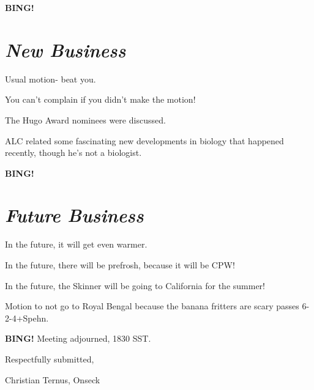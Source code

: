 \documentclass[10pt]{article}
\newcommand{\bing}{{\bf BING!} }
\newcommand{\goto}[1]{\bing \vskip 12pt \section*{{\em{#1}}}}
\begin{document}
\goto{New Business}

Usual motion- beat you.

You can't complain if you didn't make the motion!

The Hugo Award nominees were discussed.

ALC related some fascinating new developments in biology that happened recently, though he's not
a biologist.

\goto{Future Business}

In the future, it will get even warmer.

In the future, there will be prefrosh, because it will be CPW!

In the future, the Skinner will be going to California for the summer!

Motion to not go to Royal Bengal because the banana fritters are scary passes 6-2-4+Spehn.

\bing
\noindent
Meeting adjourned, 1830 SST.

\vspace{18pt}

\centerline{Respectfully submitted,}
\centerline{Christian Ternus, Onseck}
\end{document}

